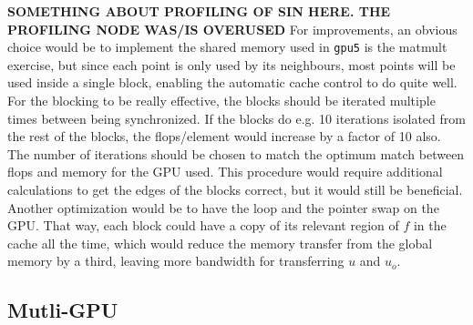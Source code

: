 \textbf{SOMETHING ABOUT PROFILING OF SIN HERE. THE PROFILING NODE WAS/IS OVERUSED}
For improvements, an obvious choice would be to implement the shared memory used in \texttt{gpu5} is the matmult exercise, but since each point is only used by its neighbours, most points will be used inside a single block, enabling the automatic cache control to do quite well. For the blocking to be really effective, the blocks should be iterated multiple times between being synchronized. If the blocks do e.g. 10 iterations isolated from the rest of the blocks, the flops/element would increase by a factor of 10 also. The number of iterations should be chosen to match the optimum match between flops and memory for the GPU used. This procedure would require additional calculations to get the edges of the blocks correct, but it would still be beneficial. Another optimization would be to have the loop and the pointer swap on the GPU. That way, each block could have a copy of its relevant region of $f$ in the cache all the time, which would reduce the memory transfer from the global memory by a third, leaving more bandwidth for transferring $u$ and $u_o$.


\subsection{Mutli-GPU}